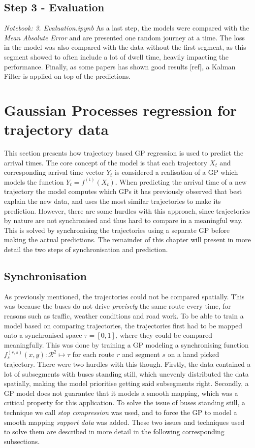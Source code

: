\subsection{Step 3 - Evaluation}
\textit{Notebook: 3. Evaluation.ipynb}
\newline
As a last step, the models were compared with the \textit{Mean Absolute Error} and are presented one random journey at a time. The loss in the model was also compared with the data without the first segment, as this segment showed to often include a lot of dwell time, heavily impacting the performance. Finally, as some papers has shown good results [ref], a Kalman Filter is applied on top of the predictions.

\section{Gaussian Processes regression for trajectory data}
This section presents how trajectory based GP regression is used to predict the arrival times. The core concept of the model is that each trajectory $X_t$ and corresponding arrival time vector $Y_t$ is considered a realisation of a GP which models the function $Y_t = f^{(t)}(X_t)$. When predicting the arrival time of a new trajectory the model computes which GPs it has previously observed that best explain the new data, and uses the most similar trajectories to make its prediction. However, there are some hurdles with this approach, since trajectories by nature are not synchronised and thus hard to compare in a meaningful way. This is solved by synchronising the trajectories using a separate GP before making the actual predictions. The remainder of this chapter will present in more detail the two steps of synchronisation and prediction.

\subsection{Synchronisation}
As previously mentioned, the trajectories could not be compared spatially. This was because the buses do not drive \textit{precisely} the same route every time, for reasons such as traffic, weather conditions and road work. To be able to train a model based on comparing trajectories, the trajectories first had to be mapped onto a synchronised space $\tau = [0, 1]$, where they could be compared meaningfully. This was done by training a GP modeling a synchronising function $f^{(r,s)}_s(x, y) : \mathcal{R}^2 \mapsto \tau$ for each route $r$ and segment $s$ on a hand picked trajectory. There were two hurdles with this though. Firstly, the data contained a lot of subsegments with buses standing still, which unevenly distributed the data spatially, making the model prioritise getting said subsegments right. Secondly, a GP model does not guarantee that it models a smooth mapping, which was a critical property for this application. To solve the issue of buses standing still, a technique we call \textit{stop compression} was used, and to force the GP to model a smooth mapping \textit{support data} was added. These two issues and techniques used to solve them are described in more detail in the following corresponding subsections.

